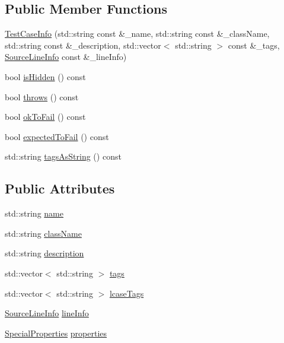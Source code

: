 \subsection*{Public Member Functions}
\begin{DoxyCompactItemize}
\item 
\hyperlink{struct_catch_1_1_test_case_info_ad1a6b08b5a83d1c5eb4596b727b5305f}{Test\-Case\-Info} (std\-::string const \&\-\_\-name, std\-::string const \&\-\_\-class\-Name, std\-::string const \&\-\_\-description, std\-::vector$<$ std\-::string $>$ const \&\-\_\-tags, \hyperlink{struct_catch_1_1_source_line_info}{Source\-Line\-Info} const \&\-\_\-line\-Info)
\item 
bool \hyperlink{struct_catch_1_1_test_case_info_a01ac8b11d8c105e5278a239ab5214257}{is\-Hidden} () const 
\item 
bool \hyperlink{struct_catch_1_1_test_case_info_a19fb4f0b755956eee8a1fecf713fb7ca}{throws} () const 
\item 
bool \hyperlink{struct_catch_1_1_test_case_info_a64586336bb49bd6e9ef8a089b072a712}{ok\-To\-Fail} () const 
\item 
bool \hyperlink{struct_catch_1_1_test_case_info_a1ed1c3689c2874c421466945bd3cb75c}{expected\-To\-Fail} () const 
\item 
std\-::string \hyperlink{struct_catch_1_1_test_case_info_aef91e9cfdd8a225d3ad856586e6b52cc}{tags\-As\-String} () const 
\end{DoxyCompactItemize}
\subsection*{Public Attributes}
\begin{DoxyCompactItemize}
\item 
std\-::string \hyperlink{struct_catch_1_1_test_case_info_a463794e2f5cfead307c93efd134ade36}{name}
\item 
std\-::string \hyperlink{struct_catch_1_1_test_case_info_a1a5e0825132a38d091defdebbf2f8ce9}{class\-Name}
\item 
std\-::string \hyperlink{struct_catch_1_1_test_case_info_a37fe2db9425bc45f6a33893eac31198e}{description}
\item 
std\-::vector$<$ std\-::string $>$ \hyperlink{struct_catch_1_1_test_case_info_a150a7cbca1dd0c91799ccb14ff822eb0}{tags}
\item 
std\-::vector$<$ std\-::string $>$ \hyperlink{struct_catch_1_1_test_case_info_a844e3de9baf6e53cadfba9733c236bfe}{lcase\-Tags}
\item 
\hyperlink{struct_catch_1_1_source_line_info}{Source\-Line\-Info} \hyperlink{struct_catch_1_1_test_case_info_aa9407b7f442655b51a2aad24b3fa2fd3}{line\-Info}
\item 
\hyperlink{struct_catch_1_1_test_case_info_a39b232f74b4a7a6f2183b96759027eac}{Special\-Properties} \hyperlink{struct_catch_1_1_test_case_info_afc1e84bd7a2e180895a06d9131302af0}{properties}
\end{DoxyCompactItemize}
